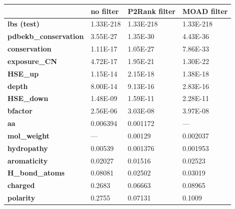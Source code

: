 \begin{table}[!htbp]
\centering
\begin{tabular}{llll}
\hline
                              & \textbf{no filter} & \textbf{P2Rank filter} & \textbf{MOAD filter} \\ \hline
\textbf{lbs (test)}                  & 1.33E-218          & 1.33E-218              & 1.33E-218            \\
\textbf{pdbekb\_conservation} & 3.55E-27           & 1.35E-30               & 4.43E-36             \\
\textbf{conservation}         & 1.11E-17           & 1.05E-27               & 7.86E-33             \\
\textbf{exposure\_CN}         & 4.72E-17           & 1.95E-21               & 1.30E-22             \\
\textbf{HSE\_up}              & 1.15E-14           & 2.15E-18               & 1.38E-18             \\
\textbf{depth}                & 8.00E-14           & 9.13E-16               & 2.83E-16             \\
\textbf{HSE\_down}            & 1.48E-09           & 1.59E-11               & 2.28E-11             \\
\textbf{bfactor}              & 2.56E-06           & 3.03E-08               & 3.97E-08             \\
\textbf{aa}                   & 0.006394           & 0.001172               & ---                  \\
\textbf{mol\_weight}          & ---                & 0.00129                & 0.002037             \\
\textbf{hydropathy}           & 0.00539            & 0.001376               & 0.001953             \\
\textbf{aromaticity}          & 0.02027            & 0.01516                & 0.02523              \\
\textbf{H\_bond\_atoms}       & 0.08081            & 0.02502                & 0.03019              \\
\textbf{charged}              & 0.2683             & 0.06663                & 0.08965              \\
\textbf{polarity}             & 0.2755             & 0.07131                & 0.1009               \\

\end{tabular}
\end{table}

